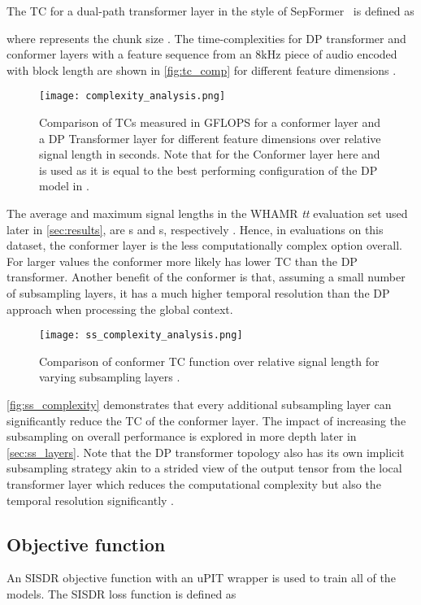 The \ac{TC} for a dual-path transformer layer in the style of SepFormer~\cite{sepformer} is defined as

where  represents the chunk size \cite{sepformer}.
The time-com\-plexities for \ac{DP} transformer and conformer layers with a feature sequence from an 8kHz piece of audio encoded with block length  are shown in \autoref{fig:tc_comp} for different feature dimensions . 
\begin{figure}[!ht]
    \centering
    \texttt{[image: complexity\_analysis.png]}
    \caption{Comparison of \acp{TC} measured in {GFLOPS} for a conformer layer and a \ac{DP} Transformer layer for different feature dimensions  over relative signal length in seconds. Note that  for the Conformer layer here and  is used as it is equal to the best performing configuration of the \ac{DP} model in \cite{sepformer}.}
    \label{fig:tc_comp}
\end{figure}
The average and maximum signal lengths in the WHAMR \textit{tt} evaluation set used later in \autoref{sec:results}, are s and s, respectively \cite{tsllimits}. Hence, in evaluations on this dataset, the conformer layer is the less computationally complex option overall. For larger  values the conformer more likely has lower \ac{TC} than the \ac{DP} transformer. Another benefit of the conformer is that, assuming a small number of subsampling layers, it has a much higher temporal resolution than the \ac{DP} approach when processing the global context.
\begin{figure}[!ht]
    \centering
    \texttt{[image: ss\_complexity\_analysis.png]}
    \caption{Comparison of conformer \ac{TC} function over relative signal length for varying subsampling layers .}
    \label{fig:ss_complexity}
\end{figure}
\autoref{fig:ss_complexity} demonstrates that every additional subsampling layer can significantly reduce the \ac{TC} of the conformer layer.
The impact of increasing the subsampling on overall performance is explored in more depth later in \autoref{sec:ss_layers}. Note that the \ac{DP} transformer topology also has its own implicit subsampling strategy akin to a strided view of the output tensor from the local transformer layer which reduces the computational complexity but also the temporal resolution significantly \cite{QDPN,sepformer}.


\subsection{Objective function}
An \ac{SISDR} objective function \cite{LeRoux,tasnet} with an \ac{uPIT} wrapper \cite{upit} is used to train all of the models. The \ac{SISDR} loss function is defined as


